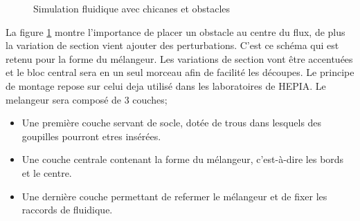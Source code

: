 \documentclass[a4paper, 11pt]{article}
\begin{document}
\begin{figure}[H]
    \centering
    \caption{Simulation fluidique avec chicanes et obstacles}
    \label{fig:simulation5}
\end{figure}
La figure \ref{fig:simulation5} montre l'importance de placer un obstacle au centre du flux, de plus la variation
de section vient ajouter des perturbations. C'est ce schéma qui est retenu pour la forme du mélangeur.
Les variations de section vont être accentuées et le bloc central sera en un seul morceau afin de facilité les
découpes.
Le principe de montage repose sur celui deja utilisé dans les laboratoires de HEPIA. Le melangeur sera composé de 3
couches;
\begin{itemize}
    \item Une première couche servant de socle, dotée de trous dans lesquels des goupilles pourront etres insérées.
    \item Une couche centrale contenant la forme du mélangeur, c'est-à-dire les bords et le centre.
    \item Une dernière couche permettant de refermer le mélangeur et de fixer les raccords de fluidique.
\end{itemize}
\newpage
\end{document}
